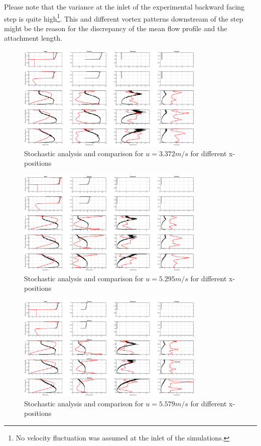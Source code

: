 \noii Please note that the variance at the inlet of the experimental backward facing step is quite high\footnote{No velocity fluctuation was assumed at the inlet of the simulations.}. This and different vortex patterns downstream of the step might be the reason for the discrepancy of the mean flow profile and the attachment length.

\newpage

\begin{figure}[!htb]
\centering
\includegraphics[trim=0 0 0 0,clip,angle=90,width=0.8\textwidth]{FIGURES/Re00_dns.eps}
\caption{Stochastic analysis and comparison for $u=3.372m/s$ for different x-positions}
\label{fig:bfsA}
\end{figure} 

\begin{figure}[!htb]
\centering
\includegraphics[trim=0 0 0 0,clip,angle=90,width=0.8\textwidth]{FIGURES/Re01_dns.eps}
\caption{Stochastic analysis and comparison for $u=5.295m/s$ for different x-positions}
\label{fig:bfsB}
\end{figure} 

\begin{figure}[!htb]
\centering
\includegraphics[trim=0 0 0 0,clip,angle=90,width=0.8\textwidth]{FIGURES/Re02_dns.eps}
\caption{Stochastic analysis and comparison for $u=5.579m/s$ for different x-positions}
\label{fig:bfsC}
\end{figure} 

